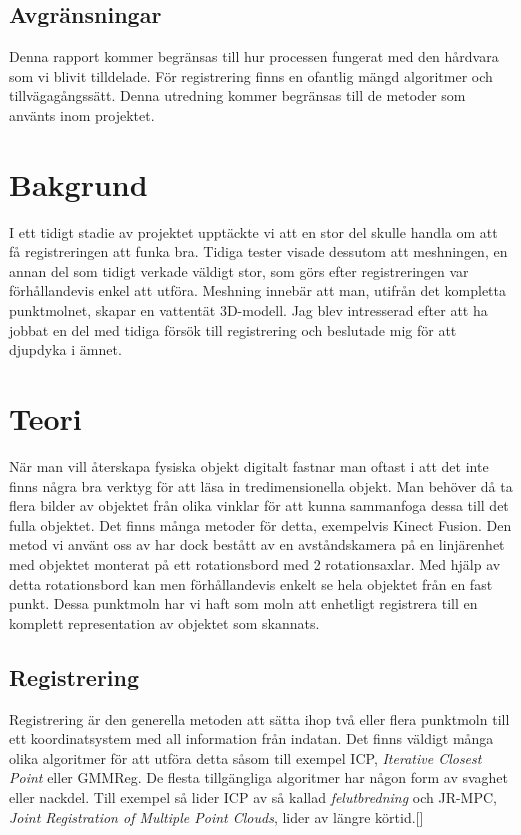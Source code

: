 \subsection{Avgränsningar}
\label{sec:limits-karlsson}
Denna rapport kommer begränsas till hur processen fungerat med den hårdvara som vi blivit tilldelade. För registrering finns en ofantlig mängd algoritmer och tillvägagångssätt. Denna utredning kommer begränsas till de metoder som använts inom projektet. 


\section{Bakgrund}
\label{sec:background-karlsson}
I ett tidigt stadie av projektet upptäckte vi att en stor del skulle handla om att få registreringen att funka bra. Tidiga tester visade dessutom att meshningen, en annan del som tidigt verkade väldigt stor, som görs efter registreringen var förhållandevis enkel att utföra. Meshning innebär att man, utifrån det kompletta punktmolnet, skapar en vattentät 3D-modell. Jag blev intresserad efter att ha jobbat en del med tidiga försök till registrering och beslutade mig för att djupdyka i ämnet.


\section{Teori}
\label{sec:theory-karlsson}

När man vill återskapa fysiska objekt digitalt fastnar man oftast i att det inte finns några bra verktyg för att läsa in tredimensionella objekt. Man behöver då ta flera bilder av objektet från olika vinklar för att kunna sammanfoga dessa till det fulla objektet. Det finns många metoder för detta, exempelvis Kinect Fusion. Den metod vi använt oss av har dock bestått av en avståndskamera på en linjärenhet med objektet monterat på ett rotationsbord med 2 rotationsaxlar. Med hjälp av detta rotationsbord kan men förhållandevis enkelt se hela objektet från en fast punkt. Dessa punktmoln har vi haft som moln att enhetligt registrera till en komplett representation av objektet som skannats.


\subsection{Registrering}
\label{sec:registrering-karlsson}

Registrering är den generella metoden att sätta ihop två eller flera punktmoln till ett koordinatsystem med all information från indatan. Det finns väldigt många olika algoritmer för att utföra detta såsom till exempel ICP, \textit{Iterative Closest Point} eller GMMReg. De flesta tillgängliga algoritmer har någon form av svaghet eller nackdel. Till exempel så lider ICP av så kallad \textit{felutbredning} och JR-MPC, \textit{Joint Registration of Multiple Point Clouds}, lider av längre körtid.[]

